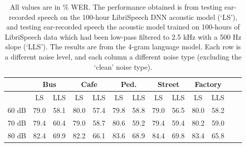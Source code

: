 \begin{table}[h]
\begin{center}
\begin{tabular}{| c || c | c | c | c | c | c | c | c | c | c | c | c |} \hline
      & \multicolumn{2}{|c|}{Bus} & \multicolumn{2}{|c|}{Cafe} & \multicolumn{2}{|c|}{Ped.} & \multicolumn{2}{|c|}{Street} & \multicolumn{2}{|c|}{Factory} \\ \hline
      & LS & LLS & LS & LLS & LS & LLS & LS & LLS & LS & LLS \\ \hline\hline
60 dB & 79.0 & 58.1 & 80.0 & 57.4 & 79.8 & 58.8 & 79.0 & 56.5 & 80.0 & 58.2  \\ \hline
70 dB & 79.4 & 60.4 & 79.0 & 58.7 & 80.6 & 59.2 & 79.4 & 59.4 & 80.2 & 59.0  \\ \hline
80 dB & 82.4 & 69.9 & 82.2 & 66.1 & 83.6 & 68.9 & 84.4 & 69.8 & 83.4 & 65.8  \\ \hline
\end{tabular}
\end{center}
\caption{All values are in \% WER. The performance obtained is from testing ear-recorded speech on the 100-hour LibriSpeech DNN acoustic model (`LS'), and testing ear-recorded speech the acoustic model trained on 100-hours of LibriSpeech data which had been low-pass filtered to 2.5 kHz with a 500 Hz slope (`LLS').  The results are from the 4-gram language model.  Each row is a different noise level, and each column a different noise type (excluding the `clean' noise type).}\label{tab:100HrDNNcmp}
\end{table}

